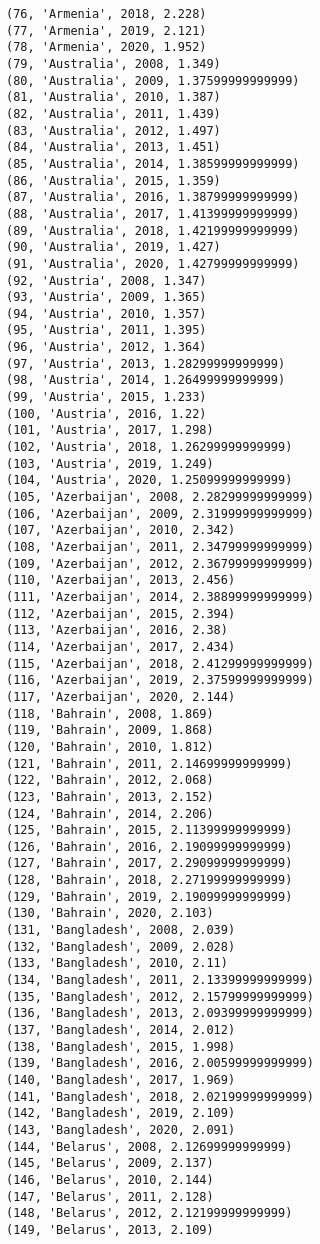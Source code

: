 \documentclass[11pt]{article}
\begin{document}
\begin{Verbatim}[commandchars=\\\{\}]
(76, 'Armenia', 2018, 2.228)
(77, 'Armenia', 2019, 2.121)
(78, 'Armenia', 2020, 1.952)
(79, 'Australia', 2008, 1.349)
(80, 'Australia', 2009, 1.37599999999999)
(81, 'Australia', 2010, 1.387)
(82, 'Australia', 2011, 1.439)
(83, 'Australia', 2012, 1.497)
(84, 'Australia', 2013, 1.451)
(85, 'Australia', 2014, 1.38599999999999)
(86, 'Australia', 2015, 1.359)
(87, 'Australia', 2016, 1.38799999999999)
(88, 'Australia', 2017, 1.41399999999999)
(89, 'Australia', 2018, 1.42199999999999)
(90, 'Australia', 2019, 1.427)
(91, 'Australia', 2020, 1.42799999999999)
(92, 'Austria', 2008, 1.347)
(93, 'Austria', 2009, 1.365)
(94, 'Austria', 2010, 1.357)
(95, 'Austria', 2011, 1.395)
(96, 'Austria', 2012, 1.364)
(97, 'Austria', 2013, 1.28299999999999)
(98, 'Austria', 2014, 1.26499999999999)
(99, 'Austria', 2015, 1.233)
(100, 'Austria', 2016, 1.22)
(101, 'Austria', 2017, 1.298)
(102, 'Austria', 2018, 1.26299999999999)
(103, 'Austria', 2019, 1.249)
(104, 'Austria', 2020, 1.25099999999999)
(105, 'Azerbaijan', 2008, 2.28299999999999)
(106, 'Azerbaijan', 2009, 2.31999999999999)
(107, 'Azerbaijan', 2010, 2.342)
(108, 'Azerbaijan', 2011, 2.34799999999999)
(109, 'Azerbaijan', 2012, 2.36799999999999)
(110, 'Azerbaijan', 2013, 2.456)
(111, 'Azerbaijan', 2014, 2.38899999999999)
(112, 'Azerbaijan', 2015, 2.394)
(113, 'Azerbaijan', 2016, 2.38)
(114, 'Azerbaijan', 2017, 2.434)
(115, 'Azerbaijan', 2018, 2.41299999999999)
(116, 'Azerbaijan', 2019, 2.37599999999999)
(117, 'Azerbaijan', 2020, 2.144)
(118, 'Bahrain', 2008, 1.869)
(119, 'Bahrain', 2009, 1.868)
(120, 'Bahrain', 2010, 1.812)
(121, 'Bahrain', 2011, 2.14699999999999)
(122, 'Bahrain', 2012, 2.068)
(123, 'Bahrain', 2013, 2.152)
(124, 'Bahrain', 2014, 2.206)
(125, 'Bahrain', 2015, 2.11399999999999)
(126, 'Bahrain', 2016, 2.19099999999999)
(127, 'Bahrain', 2017, 2.29099999999999)
(128, 'Bahrain', 2018, 2.27199999999999)
(129, 'Bahrain', 2019, 2.19099999999999)
(130, 'Bahrain', 2020, 2.103)
(131, 'Bangladesh', 2008, 2.039)
(132, 'Bangladesh', 2009, 2.028)
(133, 'Bangladesh', 2010, 2.11)
(134, 'Bangladesh', 2011, 2.13399999999999)
(135, 'Bangladesh', 2012, 2.15799999999999)
(136, 'Bangladesh', 2013, 2.09399999999999)
(137, 'Bangladesh', 2014, 2.012)
(138, 'Bangladesh', 2015, 1.998)
(139, 'Bangladesh', 2016, 2.00599999999999)
(140, 'Bangladesh', 2017, 1.969)
(141, 'Bangladesh', 2018, 2.02199999999999)
(142, 'Bangladesh', 2019, 2.109)
(143, 'Bangladesh', 2020, 2.091)
(144, 'Belarus', 2008, 2.12699999999999)
(145, 'Belarus', 2009, 2.137)
(146, 'Belarus', 2010, 2.144)
(147, 'Belarus', 2011, 2.128)
(148, 'Belarus', 2012, 2.12199999999999)
(149, 'Belarus', 2013, 2.109)

\end{Verbatim}
\end{document}
